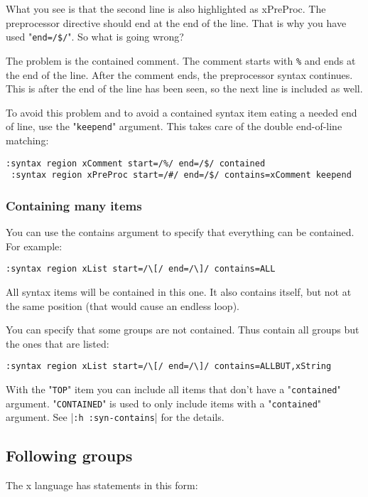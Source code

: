 What you see is that the second line is also highlighted as xPreProc.
The preprocessor directive should end at the end of the line.
That is why you have used "\texttt{end=/\$/}".
So what is going wrong?

The problem is the contained comment.
The comment starts with \texttt{\%} and ends at the end of the line.
After the comment ends, the preprocessor syntax continues.
This is after the end of the line has been seen, so the next line is included as well.

To avoid this problem and to avoid a contained syntax item eating a needed end of line, use the "\texttt{keepend}" argument.
This takes care of the double end-of-line matching:

\begin{Verbatim}[samepage=true]
 :syntax region xComment start=/%/ end=/$/ contained
 :syntax region xPreProc start=/#/ end=/$/ contains=xComment keepend
\end{Verbatim}

\subsubsection{Containing many items}
You can use the contains argument to specify that everything can be contained.
For example:

\begin{Verbatim}[samepage=true]
 :syntax region xList start=/\[/ end=/\]/ contains=ALL
\end{Verbatim}

All syntax items will be contained in this one.
It also contains itself, but not at the same position (that would cause an endless loop).

You can specify that some groups are not contained.
Thus contain all groups but the ones that are listed:

\begin{Verbatim}[samepage=true]
 :syntax region xList start=/\[/ end=/\]/ contains=ALLBUT,xString
\end{Verbatim}

With the "\texttt{TOP}" item you can include all items that don't have a "\texttt{contained}" argument.
"\texttt{CONTAINED}" is used to only include items with a "\texttt{contained}" argument.
See |\texttt{:h :syn-contains}| for the details.
\subsection{Following groups}
The x language has statements in this form:

